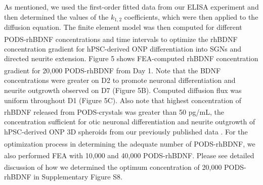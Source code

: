 \documentclass[review]{elsarticle}
\begin{document}
As mentioned, we used the first-order fitted data from our ELISA experiment and then determined the values of the $k_{1,2}$ coefficients, which were then applied to the diffusion equation. The finite element model was then computed for different PODS\textsuperscript{\textregistered}-rhBDNF concentrations and time intervals to optimize the rhBDNF concentration gradient for hPSC-derived ONP differentiation into SGNs and directed neurite extension. Figure 5 shows FEA-computed rhBDNF concentration gradient for 20,000 PODS\textsuperscript{\textregistered}-rhBDNF from Day 1. Note that the BDNF concentrations were greater on D2 to promote neuronal differentiation and neurite outgrowth observed on D7 (Figure 5B). Computed diffusion flux was uniform throughout D1 (Figure 5C). Also note that highest concentration of rhBDNF released from PODS\textsuperscript{\textregistered}-crystals was greater than 50 pg/mL, the concentration sufficient for otic neuronal differentiation and neurite outgrowth of hPSC-derived ONP 3D spheroids from our previously published data \cite{Chang2020}. For the optimization process in determining the adequate number of PODS\textsuperscript{\textregistered}-rhBDNF, we also performed FEA with 10,000 and 40,000 PODS\textsuperscript{\textregistered}-rhBDNF. Please see detailed discussion of how we determined the optimum concentration of 20,000 PODS\textsuperscript{\textregistered}-rhBDNF in Supplementary Figure S8. 
\end{document}
